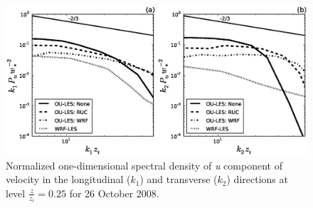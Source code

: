 \begin{figure}[H]
\begin{center}
\includegraphics[width=\textwidth]{figures/chapter6/spectra1D_u_20081026}
\end{center}
\caption{Normalized one-dimensional spectral density of \textit{u} component of velocity in the longitudinal ($k_1$) and transverse ($k_2$) directions at level $\frac{z}{z_i}=0.25$ for 26 October 2008.}
\label{figure620}
\end{figure}


